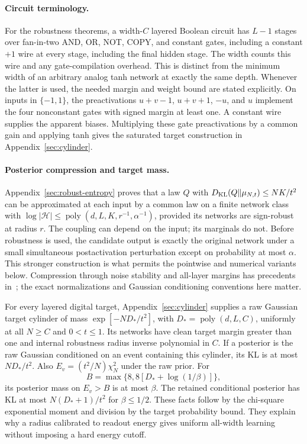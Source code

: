 \documentclass[11pt]{article}
\newcommand{\poly}{\operatorname{poly}}
\begin{document}
\paragraph{Circuit terminology.}
For the robustness theorems, a width-$C$ layered Boolean circuit has
$L-1$ stages over fan-in-two AND, OR, NOT, COPY, and constant gates,
including a constant $+1$ wire at every stage, including the final
hidden stage. The width counts this wire and any gate-compilation overhead. This is distinct from the minimum width of
an arbitrary analog tanh network at exactly the same depth. Whenever the
latter is used, the needed margin and weight bound are stated explicitly.
On inputs in $\{-1,1\}$, the preactivations
$u+v-1$, $u+v+1$, $-u$, and $u$ implement the four nonconstant gates with
signed margin at least one. A constant wire supplies the apparent biases.
Multiplying these gate preactivations by a common gain and applying tanh
gives the saturated target construction in Appendix~\ref{sec:cylinder}.

\paragraph{Posterior compression and target mass.}
Appendix~\ref{sec:robust-entropy} proves that a law $Q$ with
$D_{\rm KL}(Q\Vert\mu_{N,t})\le NK/t^2$ can be approximated at each input
by a common law on a finite network class with
$\log|\mathcal H|\le\poly(d,L,K,r^{-1},\alpha^{-1})$, provided its
networks are sign-robust at radius $r$. The coupling can depend on the
input; its marginals do not. Before robustness is used, the candidate
output is exactly the original network under a small simultaneous
postactivation perturbation except on probability at most $\alpha$.
This stronger construction is what permits the pointwise and numerical
variants below. Compression through noise stability and all-layer margins
has precedents in~\cite{arora,weima2020}; the exact normalizations and
Gaussian conditioning conventions here matter.

For every layered digital target, Appendix~\ref{sec:cylinder} supplies a
raw Gaussian target cylinder of mass $\exp[-ND_*/t^2]$, with
$D_*=\poly(d,L,C)$, uniformly at all $N\ge C$ and $0<t\le1$.
Its networks have clean target margin greater than one and internal
robustness radius inverse polynomial in $C$.
If a posterior is the raw Gaussian conditioned on an event containing
this cylinder, its KL is at most $ND_*/t^2$. Also
$E_v=(t^2/N)\chi_N^2$ under the raw prior. For
\[
 B=\max\{8,8[D_*+\log(1/\beta)]\},
\]
its posterior mass on $E_v>B$ is at most $\beta$.
The retained conditional posterior has KL at most $N(D_*+1)/t^2$
for $\beta\le1/2$. These facts follow by the chi-square exponential
moment and division by the target probability bound.
They explain why a radius calibrated to readout energy gives uniform
all-width learning without imposing a hard energy cutoff.
\end{document}
